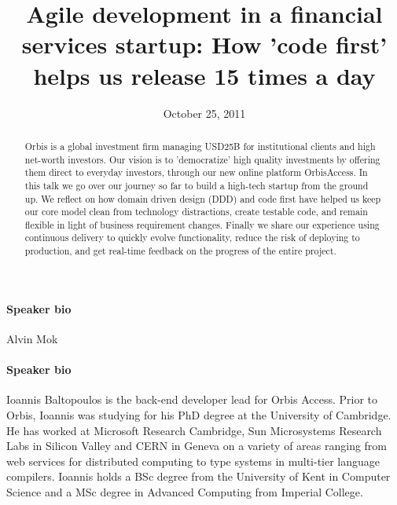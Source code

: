 \documentclass{article}
\begin{document}
\title{Agile development in a financial services startup: How 'code first'
helps us release 15 times a day}
\date{October 25, 2011}

\maketitle

\begin{abstract}
Orbis is a global investment firm managing USD25B for institutional
clients and high net-worth investors.
%
Our vision is to 'democratize' high quality investments by offering
them direct to everyday investors, through our new online platform
OrbisAccess.
%
In this talk we go over our journey so far to build a high-tech
startup from the ground up.
%
We reflect on how domain driven design (DDD) and code first have
helped us keep our core model clean from technology distractions,
create testable code, and remain flexible in light of business
requirement changes.
%
Finally we share our experience using continuous delivery to quickly
evolve functionality, reduce the risk of deploying to production, and
get real-time feedback on the progress of the entire project.
\end{abstract}




\paragraph{Speaker bio} Alvin Mok

\paragraph{Speaker bio}
Ioannis Baltopoulos is the back-end developer lead for Orbis Access.
%
Prior to Orbis, Ioannis was studying for his PhD degree at the
University of Cambridge.
%
He has worked at Microsoft Research Cambridge, Sun Microsystems
Research Labs in Silicon Valley and CERN in Geneva on a variety of
areas ranging from web services for distributed computing to type
systems in multi-tier language compilers.
%
Ioannis holds a BSc degree from the University of Kent in Computer
Science and a MSc degree in Advanced Computing from Imperial College.
\end{document}
